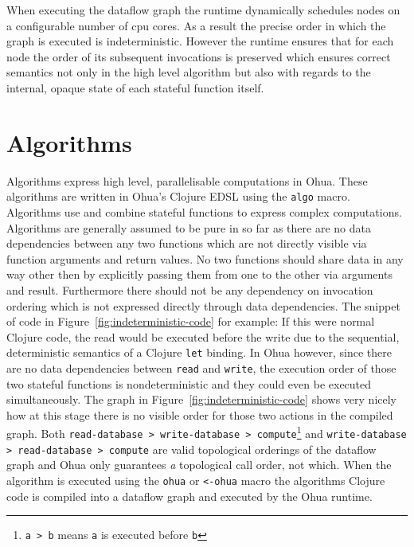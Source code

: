 When executing the dataflow graph the runtime dynamically schedules nodes on a configurable number of cpu cores.
As a result the precise order in which the graph is executed is indeterministic.
However the runtime ensures that for each node the order of its subsequent invocations is preserved which ensures correct semantics not only in the high level algorithm but also with regards to the internal, opaque state of each stateful function itself.

\section{Algorithms}

Algorithms express high level, parallelisable computations in Ohua.
These algorithms are written in Ohua's Clojure EDSL using the \texttt{algo} macro.
Algorithms use and combine stateful functions to express complex computations.
Algorithms are generally assumed to be pure in so far as there are no data dependencies between any two functions which are not directly visible via function arguments and return values.
No two functions should share data in any way other then by explicitly passing them from one to the other via arguments and result.
Furthermore there should not be any dependency on invocation ordering which is not expressed directly through data dependencies.
The snippet of code in Figure~\ref{fig:indeterministic-code} for example: If this were normal Clojure code, the read would be executed before the write due to the sequential, deterministic semantics of a Clojure \texttt{let} binding.
In Ohua however, since there are no data dependencies between \texttt{read} and \texttt{write}, the execution order of those two stateful functions is nondeterministic and they could even be executed simultaneously.
The graph in Figure~\ref{fig:indeterministic-code} shows very nicely how at this stage there is no visible order for those two actions in the compiled graph.
Both \texttt{read-database > write-database > compute}\footnote{\texttt{a > b} means \texttt{a} is executed before \texttt{b}} and \texttt{write-database > read-database > compute} are valid topological orderings of the dataflow graph and Ohua only guarantees \emph{a} topological call order, not which.
When the algorithm is executed using the \texttt{ohua} or \texttt{<-ohua} macro the algorithms Clojure code is compiled into a dataflow graph and executed by the Ohua runtime.

